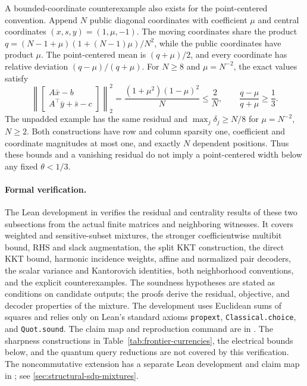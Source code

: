 A bounded-coordinate counterexample also exists for the point-centered
convention.  Append \(N\) public diagonal coordinates with
coefficient \(\mu\) and central coordinates \((x,s,y)=(1,\mu,-1)\).
The moving coordinates share the product
\(q=(N-1+\mu)(1+(N-1)\mu)/N^2\), while the public coordinates have
product \(\mu\).  The point-centered mean is \((q+\mu)/2\), and
every coordinate has relative deviation \((q-\mu)/(q+\mu)\).
For \(N\geq8\) and \(\mu=N^{-2}\), the exact values satisfy
\[
 \left\|\begin{bmatrix}A\bar x-b\\A^\top\bar y+\bar s-c\end{bmatrix}\right\|_2^2
 =\frac{(1+\mu^2)(1-\mu)^2}{N}\leq\frac2N,
 \qquad \frac{q-\mu}{q+\mu}\geq\frac13.
\]
The unpadded example has the same residual and
\(\max_j\delta_j\geq N/8\) for \(\mu=N^{-2}\), \(N\geq2\).
Both constructions have row and column sparsity one, coefficient and
coordinate magnitudes at most one, and exactly \(N\) dependent positions.
Thus these bounds and a vanishing residual do not imply a point-centered
width below any fixed \(\theta<1/3\).

\paragraph{Formal verification.}
The Lean development in  verifies the
residual and centrality results of these two subsections from the actual
finite matrices and neighboring witnesses.  It covers weighted and
sensitive-subset mixtures, the stronger coefficientwise multibit bound,
RHS and slack augmentation, the split KKT construction, the direct KKT
bound, harmonic incidence weights, affine and normalized pair decoders,
the scalar variance and Kantorovich identities, both neighborhood
conventions, and the explicit counterexamples.  The soundness hypotheses
are stated as conditions on candidate outputs; the proofs derive the
residual, objective, and decoder properties of the mixture.  The development
uses Euclidean sums of squares and relies only on Lean's standard axioms
\texttt{propext}, \texttt{Classical.choice}, and \texttt{Quot.sound}.
The claim map and reproduction command are in .
The sharpness constructions in Table~\ref{tab:frontier-currencies},
the electrical bounds below, and the quantum query reductions are not
covered by this verification.  The noncommutative extension has a separate
Lean development and claim map in ; see
\cref{sec:structural-sdp-mixtures}.

